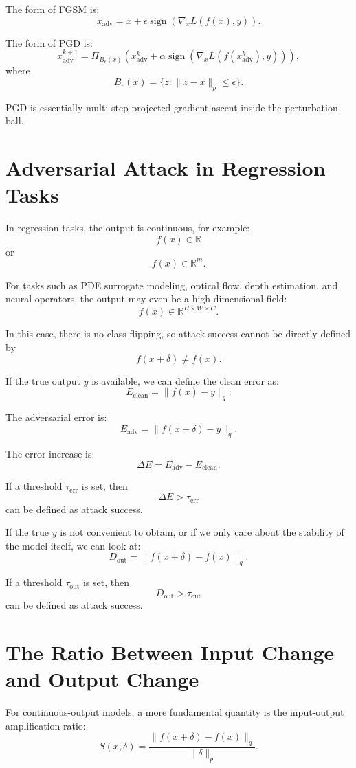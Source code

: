 \documentclass{article}
\begin{document}
The form of FGSM is:
\[
x_{\mathrm{adv}}
=
x+
\epsilon\operatorname{sign}
\left(
\nabla_x L(f(x),y)
\right).
\]

The form of PGD is:
\[
x_{\mathrm{adv}}^{k+1}
=
\Pi_{B_\epsilon(x)}
\left(
x_{\mathrm{adv}}^k
+
\alpha
\operatorname{sign}
\left(
\nabla_x L(f(x_{\mathrm{adv}}^k),y)
\right)
\right),
\]
where
\[
B_\epsilon(x)=\{z:\|z-x\|_p\leq \epsilon\}.
\]

PGD is essentially multi-step projected gradient ascent inside the perturbation ball.

\section{Adversarial Attack in Regression Tasks}

In regression tasks, the output is continuous, for example:
\[
f(x)\in \mathbb{R}
\]
or
\[
f(x)\in \mathbb{R}^m.
\]

For tasks such as PDE surrogate modeling, optical flow, depth estimation, and neural operators, the output may even be a high-dimensional field:
\[
f(x)\in \mathbb{R}^{H\times W\times C}.
\]

In this case, there is no class flipping, so attack success cannot be directly defined by
\[
f(x+\delta)\neq f(x).
\]

If the true output \(y\) is available, we can define the clean error as:
\[
E_{\mathrm{clean}}
=
\|f(x)-y\|_q.
\]

The adversarial error is:
\[
E_{\mathrm{adv}}
=
\|f(x+\delta)-y\|_q.
\]

The error increase is:
\[
\Delta E
=
E_{\mathrm{adv}}-E_{\mathrm{clean}}.
\]

If a threshold \(\tau_{\mathrm{err}}\) is set, then
\[
\Delta E>\tau_{\mathrm{err}}
\]
can be defined as attack success.

If the true \(y\) is not convenient to obtain, or if we only care about the stability of the model itself, we can look at:
\[
D_{\mathrm{out}}
=
\|f(x+\delta)-f(x)\|_q.
\]

If a threshold \(\tau_{\mathrm{out}}\) is set, then
\[
D_{\mathrm{out}}>\tau_{\mathrm{out}}
\]
can be defined as attack success.

\section{The Ratio Between Input Change and Output Change}

For continuous-output models, a more fundamental quantity is the input-output amplification ratio:
\[
S(x,\delta)
=
\frac{
\|f(x+\delta)-f(x)\|_q
}{
\|\delta\|_p
}.
\]
\end{document}
